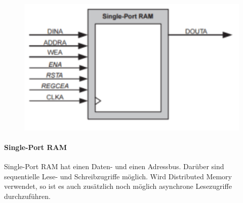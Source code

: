 \begin{minipage}{0.3\textwidth}
    \begin{figure}[H]
        \includegraphics[width=1\textwidth]{images/singleportram.png}
    \end{figure}
\end{minipage}
\hfill
\begin{minipage}{0.65\textwidth}
    \paragraph{Single-Port RAM}
    Single-Port RAM hat einen Daten- und einen Adressbus. Darüber sind sequentielle Lese- und Schreibzugriffe möglich. Wird Distributed Memory verwendet, so ist es auch zusätzlich noch möglich asynchrone Lesezugriffe durchzuführen. \ \\ \ \\ \ \\
\end{minipage}

